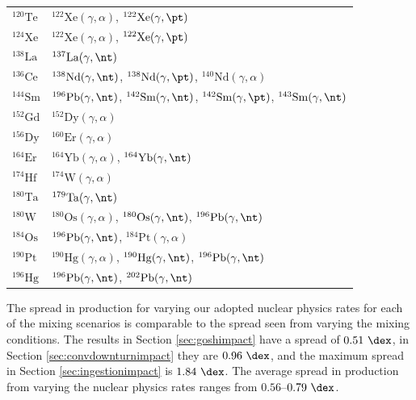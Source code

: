 \begin{table}[!htb]
\begin{tabular}{ll}
$^{120}\mathrm{Te}$ & $^{122}\mathrm{Xe}(\gamma,\alpha)$, $^{122}\mathrm{Xe}(\gamma,\pt)$ \\
$^{124}\mathrm{Xe}$ & $^{122}\mathrm{Xe}(\gamma,\alpha)$, $^{122}\mathrm{Xe}(\gamma,\pt)$ \\
$^{138}\mathrm{La}$ & $^{137}\mathrm{La}(\gamma,\nt)$ \\
$^{136}\mathrm{Ce}$ & $^{138}\mathrm{Nd}(\gamma,\nt)$, $^{138}\mathrm{Nd}(\gamma,\pt)$, $^{140}\mathrm{Nd}(\gamma,\alpha)$ \\
$^{144}\mathrm{Sm}$ & $^{196}\mathrm{Pb}(\gamma,\nt)$, $^{142}\mathrm{Sm}(\gamma,\nt)$, $^{142}\mathrm{Sm}(\gamma,\pt)$, $^{143}\mathrm{Sm}(\gamma,\nt)$ \\
$^{152}\mathrm{Gd}$ & $^{152}\mathrm{Dy}(\gamma,\alpha)$ \\
$^{156}\mathrm{Dy}$ & $^{160}\mathrm{Er}(\gamma,\alpha)$ \\
$^{164}\mathrm{Er}$ & $^{164}\mathrm{Yb}(\gamma,\alpha)$, $^{164}\mathrm{Yb}(\gamma,\nt)$ \\
$^{174}\mathrm{Hf}$ & $^{174}\mathrm{W}(\gamma,\alpha)$ \\
$^{180}\mathrm{Ta}$ & $^{179}\mathrm{Ta}(\gamma,\nt)$ \\
$^{180}\mathrm{W}$ & $^{180}\mathrm{Os}(\gamma,\alpha)$, $^{180}\mathrm{Os}(\gamma,\nt)$, $^{196}\mathrm{Pb}(\gamma,\nt)$ \\
$^{184}\mathrm{Os}$ & $^{196}\mathrm{Pb}(\gamma,\nt)$, $^{184}\mathrm{Pt}(\gamma,\alpha)$ \\
$^{190}\mathrm{Pt}$ & $^{190}\mathrm{Hg}(\gamma,\alpha)$, $^{190}\mathrm{Hg}(\gamma,\nt)$, $^{196}\mathrm{Pb}(\gamma,\nt)$ \\
$^{196}\mathrm{Hg}$ & $^{196}\mathrm{Pb}(\gamma,\nt)$, $^{202}\mathrm{Pb}(\gamma,\nt)$ \\
\hline
\end{tabular}
\end{table}

The spread in production for varying our adopted nuclear physics rates for each of the mixing scenarios is comparable to the spread seen from varying the mixing conditions.
The results in Section \ref{sec:goshimpact} have a spread of $0.51~\dex$, in Section \ref{sec:convdownturnimpact} they are $0.96~\dex$, and the maximum spread in Section \ref{sec:ingestionimpact} is $1.84~\dex$.
The average spread in production from varying the nuclear physics rates ranges from $0.56${--}$0.79~\dex$.

